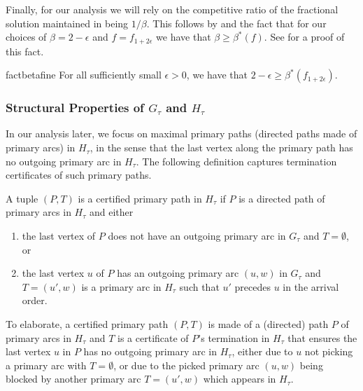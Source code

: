Finally, for our analysis we will rely on the competitive ratio 
of the fractional solution maintained in  being $1/\beta$.
This follows by  and the fact that for our choices of $\beta=2-\epsilon$ and $f=f_{1+2\epsilon}$ we have that $\beta\geq \beta^*(f)$. See  for a proof of this fact.

\begin{restatable}{fact}{betafine}\label{beta-fine}
	For all sufficiently small $\epsilon>0$, we have that $2-\epsilon \geq \beta^*(f_{1+2\epsilon})$.
\end{restatable}

\subsubsection{Structural Properties of \texorpdfstring{$G_\tau$}{G-tau} and \texorpdfstring{$H_\tau$}{H-tau}}
\label{sec:structural}

In our analysis later, we focus on maximal primary paths (directed paths made of primary arcs) in $H_\tau$, 
in the sense that the last vertex along the primary path has no outgoing primary arc in $H_\tau$. 
The following definition captures termination certificates of such primary paths.
\begin{Def}
	A tuple $(P, T)$ is a certified primary path in $H_\tau$ if $P$ is a directed path of primary arcs in $H_\tau$ and either
	\begin{enumerate}
	  \item[{\bf (a)}] the last vertex of $P$ does not have an outgoing primary arc in $G_\tau$ and $T=\emptyset$, or 
	  \item[{\bf (b)}] the last vertex $u$ of $P$ has an outgoing primary arc $(u, w)$ in $G_\tau$ and $T=(u', w)$ is a primary arc in $H_\tau$ such that $u'$ precedes $u$ in the arrival order. 
	\end{enumerate}
  \label{def:primarypath}
\end{Def}
To elaborate, a certified primary path $(P,T)$ is made of a (directed) path $P$ of primary arcs in $H_\tau$ and $T$ is a certificate of $P$'s termination in $H_\tau$ that ensures the last vertex $u$ in $P$ has no outgoing primary arc in $H_\tau$, either due to $u$ not picking a primary arc with $T=\emptyset$, or due to the picked primary arc $(u,w)$ being blocked by another primary arc $T=(u',w)$ which appears in $H_\tau$.

